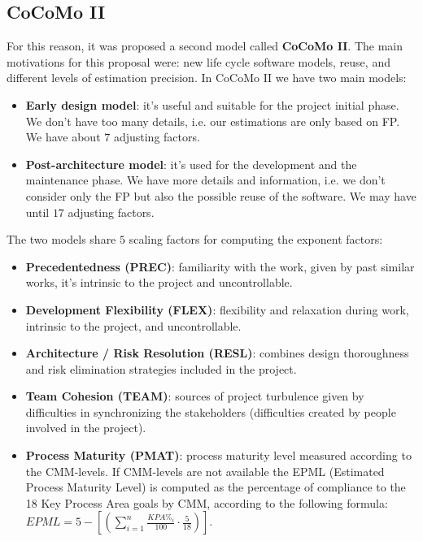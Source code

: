 \subsection{CoCoMo II}
For this reason, it was proposed a second model called \textbf{CoCoMo II}.
The main motivations for this proposal were: new life cycle software models, reuse, and different levels of estimation precision.
In CoCoMo II we have two main models:
\begin{itemize}
    \item \textbf{Early design model}: it's useful and suitable for the project initial phase. We don't have too many details, i.e. our estimations are only based on FP. We have about $7$ adjusting factors.
    \item \textbf{Post-architecture model}: it's used for the development and the maintenance phase. We have more details and information, i.e. we don't consider only the FP but also the possible reuse of the software. We may have until $17$ adjusting factors.
\end{itemize}
The two models share $5$ scaling factors for computing the exponent factors:
\begin{itemize}
    \item \textbf{Precedentedness (PREC)}: familiarity with the work, given by past similar works, it’s intrinsic to the project and uncontrollable.
    \item \textbf{Development Flexibility (FLEX)}: flexibility and relaxation during work, intrinsic to the project, and uncontrollable.
    \item \textbf{Architecture / Risk Resolution (RESL)}: combines design thoroughness and risk elimination strategies included in the project.
    \item \textbf{Team Cohesion (TEAM)}: sources of project turbulence given by difficulties in synchronizing the stakeholders (difficulties created by people involved in the project).
    \item \textbf{Process Maturity (PMAT)}: process maturity level measured according to the CMM-levels. If CMM-levels are not available the EPML (Estimated Process Maturity Level) is computed as the percentage of compliance to the 18 Key Process Area goals by CMM, according to the following formula: $EPML = 5 - [( \sum_{i=1}^{n} \frac{KPA\%_i}{100} \cdot \frac{5}{18})]$.
\end{itemize}

